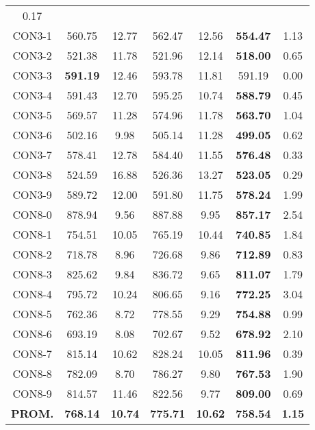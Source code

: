 \begin{table}[ht]
\begin{tabular}{c c c c c c c}
0.17\\CON3-1 & 560.75 & 12.77 & 
562.47 & 12.56 & \bf{554.47} & 
1.13\\CON3-2 & 521.38 & 11.78 & 
521.96 & 12.14 & \bf{518.00} & 
0.65\\CON3-3 & \bf{591.19} & 12.46 & 
593.78 & 11.81 & 591.19 & 0.00\\
CON3-4 & 591.43 & 12.70 & 
595.25 & 10.74 & \bf{588.79} & 
0.45\\CON3-5 & 569.57 & 11.28 & 
574.96 & 11.78 & \bf{563.70} & 
1.04\\CON3-6 & 502.16 & 9.98 & 
505.14 & 11.28 & \bf{499.05} & 
0.62\\CON3-7 & 578.41 & 12.78 & 
584.40 & 11.55 & \bf{576.48} & 
0.33\\CON3-8 & 524.59 & 16.88 & 
526.36 & 13.27 & \bf{523.05} & 
0.29\\CON3-9 & 589.72 & 12.00 & 
591.80 & 11.75 & \bf{578.24} & 
1.99\\CON8-0 & 878.94 & 9.56 & 
887.88 & 9.95 & \bf{857.17} & 
2.54\\CON8-1 & 754.51 & 10.05 & 
765.19 & 10.44 & \bf{740.85} & 
1.84\\CON8-2 & 718.78 & 8.96 & 
726.68 & 9.86 & \bf{712.89} & 
0.83\\CON8-3 & 825.62 & 9.84 & 
836.72 & 9.65 & \bf{811.07} & 
1.79\\CON8-4 & 795.72 & 10.24 & 
806.65 & 9.16 & \bf{772.25} & 
3.04\\CON8-5 & 762.36 & 8.72 & 
778.55 & 9.29 & \bf{754.88} & 
0.99\\CON8-6 & 693.19 & 8.08 & 
702.67 & 9.52 & \bf{678.92} & 
2.10\\CON8-7 & 815.14 & 10.62 & 
828.24 & 10.05 & \bf{811.96} & 
0.39\\CON8-8 & 782.09 & 8.70 & 
786.27 & 9.80 & \bf{767.53} & 
1.90\\CON8-9 & 814.57 & 11.46 & 
822.56 & 9.77 & \bf{809.00} & 
0.69\\\bf{PROM.} & 
\bf{768.14} & \bf{10.74} & \bf{775.71} & \bf{10.62} & \bf{758.54} & \bf{1.15}\\[1ex]\hline
\end{tabular}
\label{table:nonlin}
\end{table} \clearpage
